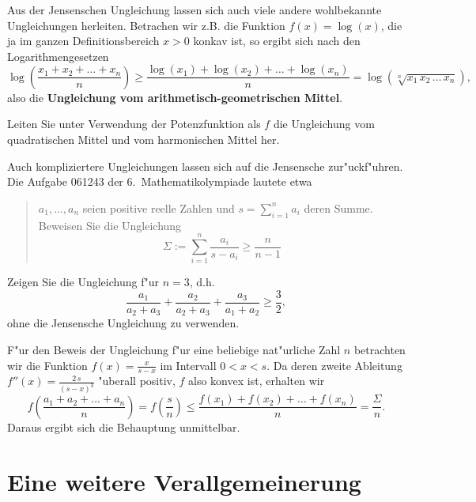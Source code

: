 \documentclass[11pt]{article}
\begin{document}
Aus der Jensenschen Ungleichung lassen sich auch viele andere
wohlbekannte Ungleichungen herleiten. Betrachen wir z.B. die Funktion
$f(x)=\log(x)$, die ja im ganzen Definitionsbereich $x>0$ konkav ist,
so ergibt sich nach den Logarithmengesetzen
\[\log\left(\frac{x_1+x_2+\ldots+x_n}{n}\right) \geq \frac{\log(x_1)
+\log(x_2) +\ldots +\log(x_n)}{n} =
\log(\sqrt[n]{x_1\,x_2\,\ldots\,x_n}), \]
also die {\bf Ungleichung vom arithmetisch-geometrischen Mittel}.


\begin{aufgabe}
Leiten Sie unter Verwendung der Potenzfunktion als $f$ die Ungleichung
vom quadratischen Mittel und vom harmonischen Mittel her.
\end{aufgabe}

Auch kompliziertere Ungleichungen lassen sich auf die Jensensche
zur"uck\-f"uhren. Die Aufgabe 061243 der 6.~Mathematikolympiade lautete etwa
\begin{quote}
$a_1,\ldots,a_n$ seien positive reelle Zahlen und
$s=\sum_{i=1}^n{a_i}$ deren Summe. Beweisen Sie die Ungleichung
\[\Sigma:=\sum_{i=1}^n{\frac{a_i}{s-a_i}}\geq \frac{n}{n-1}\]
\end{quote}

\begin{aufgabe}
Zeigen Sie die Ungleichung f"ur $n=3$, d.h.
\[\frac{a_1}{a_2+a_3}+\frac{a_2}{a_2+a_3}+\frac{a_3}{a_1+a_2} \geq
\frac{3}{2}, \] 
ohne die Jensensche Ungleichung zu verwenden.
\end{aufgabe}
 
F"ur den Beweis der Ungleichung f"ur eine beliebige nat"urliche Zahl
$n$ betrachten wir die Funktion $f(x)=\frac{x}{s-x}$ im Intervall
$0<x<s$. Da deren zweite Ableitung $f''(x)=\frac{2\,s}{{(s -x)}^{3}}$
"uberall positiv, $f$ also konvex ist, erhalten wir
\[f\left(\frac{a_1+a_2+\ldots+a_n}{n}\right)=
f\left(\frac{s}{n}\right) \leq \frac{f(x_1)+f(x_2) +\ldots
+f(x_n)}{n}={\frac{\Sigma}{n}}.\]
Daraus ergibt sich die Behauptung unmittelbar.

\section{Eine weitere Verallgemeinerung}
\end{document}
